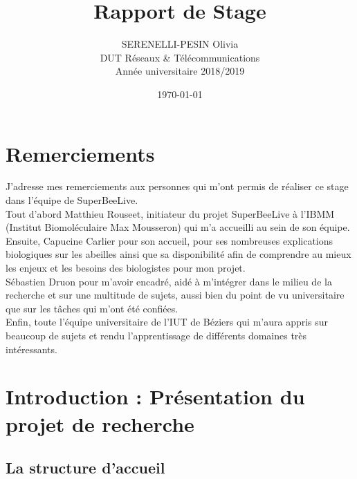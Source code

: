 \documentclass[11pt,french,a4paper]{report}
\title{\LARGE{Rapport de Stage}}
\author{\textsc{SERENELLI-PESIN} Olivia\\DUT Réseaux & Télécommunications\\Année universitaire 2018/2019}
\date{\today}
\begin{document}
\begin{titlepage}
                        } 

\end{titlepage}
\clearpage
\newpage 

\chapter*{Remerciements}

J’adresse mes remerciements aux personnes qui m’ont permis de réaliser ce stage dans l’équipe de SuperBeeLive. \\
Tout d’abord Matthieu Rouseet, initiateur du projet SuperBeeLive à l'IBMM (Institut Biomoléculaire Max Mousseron) 
qui m’a accueilli au sein de son équipe. \\

Ensuite, Capucine Carlier pour son accueil, pour ses nombreuses explications biologiques sur les abeilles ainsi que sa disponibilité 
afin de comprendre au mieux les enjeux et les besoins des biologistes pour mon projet. \\

Sébastien Druon pour m’avoir encadré, aidé à m’intégrer dans le milieu de la recherche et sur une multitude 
de sujets, aussi bien du point de vu universitaire que sur les tâches qui m’ont été confiées. \\

Enfin, toute l'équipe universitaire de l'IUT de Béziers qui m'aura appris sur beaucoup de sujets et rendu l'apprentissage
de différents domaines très intéressants. 




\tableofcontent

\clearpage

\chapter{Introduction : Présentation du projet de recherche}
\section{La structure d'accueil} 
\end{document}
